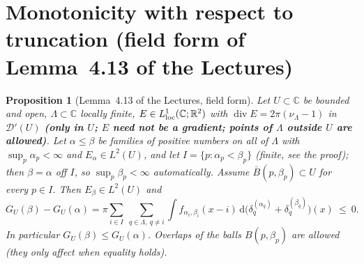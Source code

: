\documentclass[11pt]{article}
\newtheorem{proposition}[theorem]{Proposition}
\theoremstyle{definition}
\theoremstyle{remark}
\newcommand{\R}{\mathbb R}
\newcommand{\C}{\mathbb C}
\newcommand{\dd}{\,\mathrm d}
\newcommand{\Lam}{\Lambda}
\DeclareMathOperator{\Div}{div}
\begin{document}
\section{Monotonicity with respect to truncation (field form of Lemma~4.13 of the Lectures)}\label{sec:mono}

\begin{proposition}[Lemma~4.13 of the Lectures, field form]\label{prop:mono}
Let $U\subset\C$ be bounded and open, $\Lam\subset\C$ locally finite, $E\in L^1_{\rm loc}(\C;\R^2)$ with
$\Div E=2\pi(\nu_\Lam-1)$ in $\mathcal D'(U)$ \textbf{(only in $U$; $E$ need not be a gradient; points of $\Lam$ outside $U$ are
allowed)}.  Let $\alpha\le\beta$ be families of positive numbers on all of $\Lam$ with $\sup_p\alpha_p<\infty$ and $E_\alpha\in L^2(U)$, and let $I=\{p:\alpha_p<\beta_p\}$ (finite, see the proof); then $\beta=\alpha$ off $I$, so $\sup_p\beta_p<\infty$ automatically.
Assume $\bar B(p,\beta_p)\subset U$ for every $p\in I$.  Then $E_\beta\in L^2(U)$ and
\[
G_U(\beta)-G_U(\alpha)=\pi\sum_{i\in I}\ \sum_{q\in\Lam,\ q\ne i}\int f_{\alpha_i,\beta_i}(x-i)\dd\bigl(\delta_q^{(\alpha_q)}+\delta_q^{(\beta_q)}\bigr)(x)\ \le\ 0 .
\]
In particular $G_U(\beta)\le G_U(\alpha)$.  Overlaps of the balls $B(p,\beta_p)$ are allowed (they only affect when equality holds).
\end{proposition}
\end{document}
